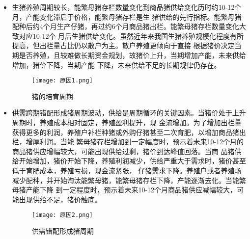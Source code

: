 \documentclass[a4paper,AutoFakeBold,AutoFakeSlant]{ctexart}
\begin{document}
\begin{itemize}
  \item 生猪养殖周期较长，能繁母猪存栏数量变化到商品猪供给变化历时约10-12个月，产能变化滞后于价格，能繁母猪存栏是生
  猪供给的先行指标。能繁母猪配种后约4个月生产仔猪，再过约6个月商品猪出栏。能繁母猪存栏数量变化大致对应10-12个
  月后生猪供给变化。虽然近年来我国生猪养殖规模化程度有所提高，但出栏量占比仍以散户为主。散户养殖更倾向于直接
  根据猪价决定当期是否养殖，且较难做长期资金规划，故猪价上升，当期增加产能，未来供给增加，猪价下降，当期产能
  下降，未来供给不足的长期规律仍存在。
  \begin{figure}[H]
    \centering
    \texttt{[image: 原因1.png]}
    \caption{猪的培育周期}
    \label{}
  \end{figure}
  \item 供需跨期错配形成猪周期波动，供给是周期循环的关键因素。当猪价处于上升周期时，养殖成本相对固定，养殖盈利提升，现
  金流增加。为了增加出栏量获得更多的利润，养殖户补栏种猪或外购仔猪甚至二次育肥，以增加商品猪出栏，增厚利润。当能
  繁母猪存栏增加到一定幅度时，预示着未来10-12个月的商品猪供应增幅较大，可能出现供给过剩，猪价到达峰值回落。当商
  品猪供给开始增加，猪价开始下降，养殖利润减少，供给严重大于需求时，猪价甚至低于育肥成本，养殖亏损，现金流紧张，
  仔猪需求下降。养殖户或者养殖场减少配种，并开始淘汰能繁母猪，能繁母猪存栏下降，产能逐渐去化。当能繁母猪产能下降
  到一定程度时，预示着未来10-12个月商品猪供应减幅较大，可能出现供给不足，猪价触底。
  \begin{figure}[H]
    \centering
    \texttt{[image: 原因2.png]}
    \caption{供需错配形成猪周期}
    \label{}
  \end{figure}
\end{itemize}

\begin{table}[H]
\begin{center}
\label{}
\caption{历次猪周期上行期}
\end{center}
\end{table}
\end{document}
